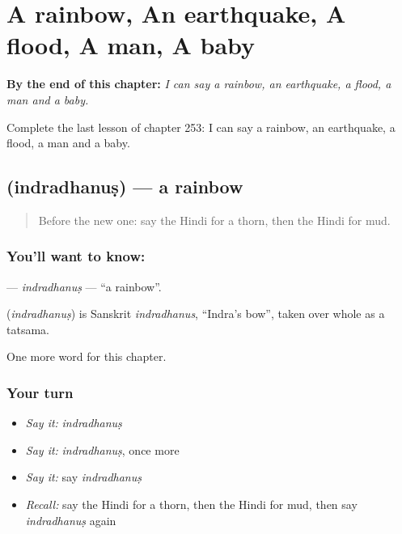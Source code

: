
\chapter{A rainbow, An earthquake, A flood, A man, A baby}
\label{ch:hi-a-rainbow-an-earthquake-a-flood-a-man-a-baby}

\begin{chapteropening}
\textbf{By the end of this chapter:} \emph{I can say a rainbow, an earthquake, a flood, a man and a baby.}

Complete the last lesson of chapter 253: I can say a rainbow, an earthquake, a flood, a man and a baby.
\end{chapteropening}

\section[\texorpdfstring{\hi{इंद्रधनुष} (indradhanuṣ)}{इंद्रधनुष (indradhanuṣ)}]{ (indradhanuṣ) — a rainbow}

\label{lesson:HI-C253-indradhanus}



\begin{quote}
Before the new one: say the Hindi for a thorn, then the Hindi for mud.
\end{quote}

\subsection*{You'll want to know: }
\textbf{} — \emph{indradhanuṣ} — \textquotedblleft{}a rainbow\textquotedblright{}.

\begin{cousinweb}
\textbf{} (\emph{indradhanuṣ}) is Sanskrit \emph{indradhanus}, \textquotedblleft{}Indra's bow\textquotedblright{}, taken over whole as a tatsama.
\end{cousinweb}

\begin{grammarlens}[title={What you've built}]
One more word for this chapter.
\end{grammarlens}

\subsection*{Your turn}
\begin{itemize}
\raggedright
  \item \emph{Say it:} \emph{indradhanuṣ}
  \item \emph{Say it:} \emph{indradhanuṣ}, once more
  \item \emph{Say it:} say \emph{indradhanuṣ}
  \item \emph{Recall:} say the Hindi for a thorn, then the Hindi for mud, then say \emph{indradhanuṣ} again
\end{itemize}

